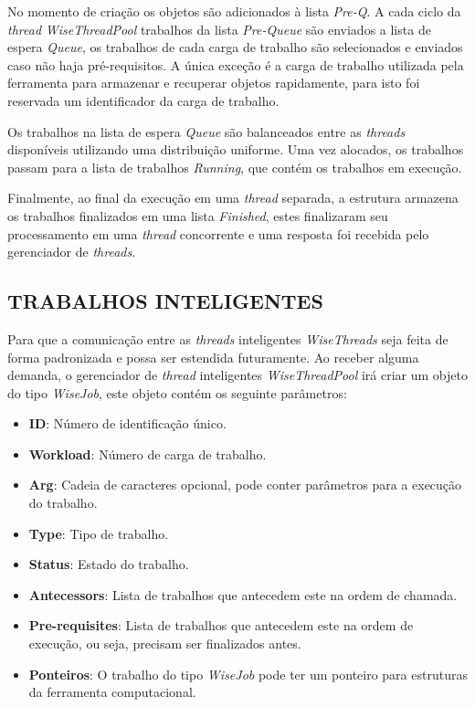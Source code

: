 No momento de criação os objetos são adicionados à lista \textit{Pre-Q}. A cada ciclo da \textit{thread} \textit{WiseThreadPool} trabalhos da lista \textit{Pre-Queue} são enviados a lista de espera \textit{Queue}, os trabalhos de cada carga de trabalho são selecionados e enviados caso não haja pré-requisitos. A única exceção é a carga de trabalho utilizada pela ferramenta para armazenar e recuperar objetos rapidamente, para isto foi reservada um identificador da carga de trabalho.

Os trabalhos na lista de espera \textit{Queue} são balanceados entre as \textit{threads} disponíveis utilizando uma distribuição uniforme. Uma vez alocados, os trabalhos passam para a lista de trabalhos \textit{Running}, que contém os trabalhos em execução.

Finalmente, ao final da execução em uma \textit{thread} separada, a estrutura armazena os trabalhos finalizados em uma lista \textit{Finished}, estes finalizaram seu processamento em uma \textit{thread} concorrente e uma resposta foi recebida pelo gerenciador de \textit{threads}.

\subsection{TRABALHOS INTELIGENTES}\label{sec:trabalhos}

Para que a comunicação entre as \textit{threads} inteligentes \textit{WiseThreads} seja feita de forma padronizada e possa ser estendida futuramente. Ao receber alguma demanda, o gerenciador de \textit{thread} inteligentes \textit{WiseThreadPool} irá criar um objeto do tipo \textit{WiseJob}, este objeto contém os seguinte parâmetros:

\begin{itemize}
	\item \textbf{ID}: Número de identificação único.
	\item \textbf{Workload}: Número de carga de trabalho.
	\item \textbf{Arg}: Cadeia de caracteres opcional, pode conter parâmetros para a execução do trabalho.
	\item \textbf{Type}: Tipo de trabalho.
	\item \textbf{Status}: Estado do trabalho.
	\item \textbf{Antecessors}: Lista de trabalhos que antecedem este na ordem de chamada.
	\item \textbf{Pre-requisites}: Lista de trabalhos que antecedem este na ordem de execução, ou seja, precisam ser finalizados antes.
	\item \textbf{Ponteiros}: O trabalho do tipo \textit{WiseJob} pode ter um ponteiro para estruturas da ferramenta computacional.
\end{itemize}


